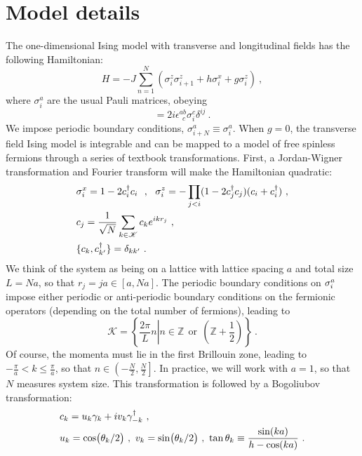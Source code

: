 \section{Model details}
The one-dimensional Ising model with transverse and longitudinal fields has the following Hamiltonian:
\begin{equation}
H=-J\sum_{n=1}^N\left(\sigma^{z}_i \sigma^{z}_{i+1}+h\sigma_i^x +g\sigma_i^z\right)~,
\end{equation}
where $\sigma_i^a$ are the usual Pauli matrices, obeying
\begin{equation}
[\s_i^a,\s_j^b]=2i\epsilon^{ab}_{~~c} \sigma_i^c \delta^{ij}~.
\end{equation}
We impose periodic boundary conditions, $\sigma^{a}_{i+N}\equiv \sigma^{a}_i$. When $g=0$, the transverse field Ising model is integrable and can be mapped to a model of free spinless fermions through a series of textbook transformations. First, a Jordan-Wigner transformation and Fourier transform will make the Hamiltonian quadratic:
\begin{align}
&\sigma_i^x=1-2c_i^\dagger c_i ~~,~~ \sigma_i^z=-\prod_{j<i}(1-2c_j^\dagger c_j)(c_i+c_i^\dagger) \ , \nonumber\\
&c_j=\frac{1}{\sqrt{N}} \sum_{k \in \mathcal{K}} c_k e^{ikr_j} \ , \\
&\{c_k,c^\dagger_{k'}\}=\delta_{kk'} \ . \nonumber
\end{align}
We think of the system as being on a lattice with lattice spacing $a$ and total size $L=Na$, so that $r_j=j a \in [a,N a]$. The periodic boundary conditions on $\sigma_i^a$ impose either periodic or anti-periodic boundary conditions on the fermionic operators (depending on the total number of fermions), leading to
\begin{equation}
\mathcal{K}= \left\{\frac{2\pi}{L} n \left| n\in \mathbb{Z} ~~\text{or}~~ \left(\mathbb{Z}+\frac{1}{2}\right) \right. \right\}~.
\end{equation}
Of course, the momenta must lie in the first Brillouin zone, leading to $-\frac{\pi}{a}<k\leq\frac{\pi}{a}$, so that $n \in \left ( -\frac{N}{2}, \frac{N}{2} \right ] $. In practice, we will work with $a=1$, so that $N$ measures system size. 
This transformation is followed by a Bogoliubov transformation:
\begin{align}
&c_k=u_k \gamma_k + iv_k \gamma^\dagger_{-k}~, \nonumber \\
&u_k=\cos(\theta_k/2)~,~v_k=\sin(\theta_k/2)~,~\tan\theta_k\equiv \frac{\sin(ka)}{h-\cos(ka)}~.
\end{align}
